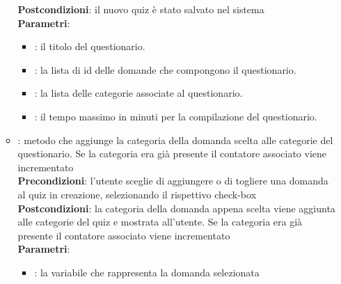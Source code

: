 \begin{itemize}
\begin{itemize}
		\textbf{Postcondizioni}: il nuovo quiz è stato salvato nel sistema \\
		\textbf{Parametri}:
			\begin{itemize}
				\item{}: il titolo del questionario.\\
				\item{}: la lista di id delle domande che compongono il questionario.\\
				\item{}: la lista delle categorie associate al questionario.\\				
				\item{}: il tempo massimo in minuti per la compilazione del questionario.\\
			\end{itemize}
		\item{}: metodo che aggiunge la categoria della domanda scelta alle categorie del questionario. Se la categoria era già presente il contatore associato viene incrementato\\
		\textbf{Precondizioni}: l'utente sceglie di aggiungere o di togliere una domanda al quiz in creazione, selezionando il rispettivo check-box\\
		\textbf{Postcondizioni}: la categoria della domanda appena scelta viene aggiunta alle categorie del quiz e mostrata all'utente. Se la categoria era già presente il contatore associato viene incrementato\\
		\textbf{Parametri}:
		\begin{itemize}
				\item{}: la variabile che rappresenta la domanda selezionata\\
			\end{itemize}
	\end{itemize}
\end{itemize}


